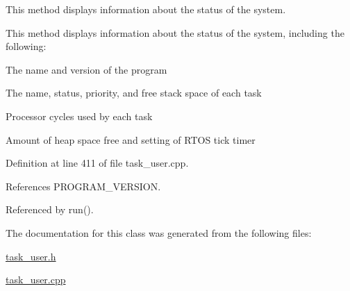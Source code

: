 This method displays information about the status of the system. 

This method displays information about the status of the system, including the following\-: \begin{DoxyItemize}
\item The name and version of the program \item The name, status, priority, and free stack space of each task \item Processor cycles used by each task \item Amount of heap space free and setting of R\-T\-O\-S tick timer \end{DoxyItemize}


Definition at line 411 of file task\-\_\-user.\-cpp.



References P\-R\-O\-G\-R\-A\-M\-\_\-\-V\-E\-R\-S\-I\-O\-N.



Referenced by run().



The documentation for this class was generated from the following files\-:\begin{DoxyCompactItemize}
\item 
\hyperlink{task__user_8h}{task\-\_\-user.\-h}\item 
\hyperlink{task__user_8cpp}{task\-\_\-user.\-cpp}\end{DoxyCompactItemize}
